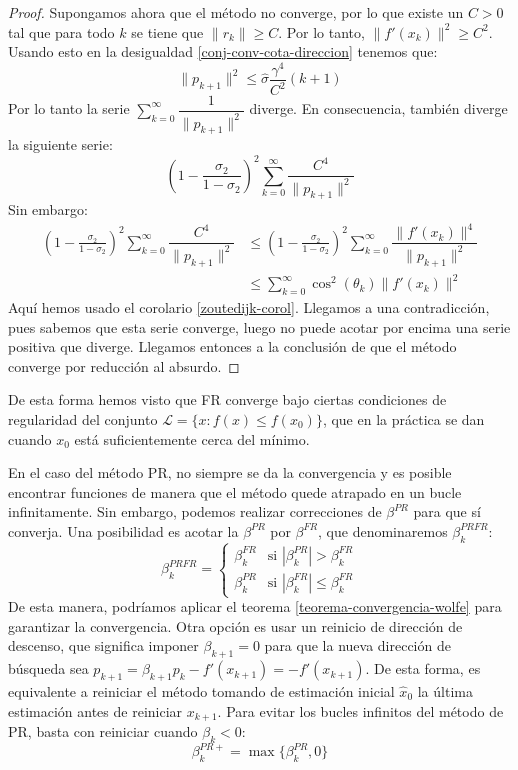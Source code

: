 \begin{theorem}
\begin{proof}
	Supongamos ahora que el método no converge, por lo que existe un $C>0$ tal que para todo $k$ se tiene que $\|r_k\|\geq C$. Por lo tanto, $\|f'(x_k)\|^2\geq C^2$. Usando esto en la desigualdad \eqref{conj-conv-cota-direccion} tenemos que:
	\begin{equation}
		\|p_{k+1}\|^2 \leq \hat{\sigma}\frac{\gamma^4}{C^2} (k+1)
	\end{equation}
	Por lo tanto la serie $\sum_{k=0}^\infty \dfrac{1}{\|p_{k+1}\|^2}$ diverge. En consecuencia, también diverge la siguiente serie:
	\[ \left(1-\frac{\sigma_2}{1-\sigma_2}\right)^2 \sum_{k=0}^\infty \dfrac{C^4}{\|p_{k+1}\|^2} \]
	Sin embargo:
	\begin{align*}
		\left(1-\frac{\sigma_2}{1-\sigma_2}\right)^2 \sum_{k=0}^\infty \dfrac{C^4}{\|p_{k+1}\|^2} & \leq \left(1-\frac{\sigma_2}{1-\sigma_2}\right)^2 \sum_{k=0}^\infty \dfrac{\|f'(x_k)\|^4}{\|p_{k+1}\|^2}\\
		& \leq \sum_{k=0}^\infty \cos^2(\theta_k) \|f'(x_k)\|^2
	\end{align*}
	Aquí hemos usado el corolario \ref{zoutedijk-corol}. Llegamos a una contradicción, pues sabemos que esta serie converge, luego no puede acotar por encima una serie positiva que diverge. Llegamos entonces a la conclusión de que el método converge por reducción al absurdo.
\end{proof}
\end{theorem}

De esta forma hemos visto que FR converge bajo ciertas condiciones de regularidad del conjunto $\mathcal{L}=\{x : f(x) \leq f(x_0)\}$, que en la práctica se dan cuando $x_0$ está suficientemente cerca del mínimo.

En el caso del método PR, no siempre se da la convergencia y es posible encontrar funciones de manera que el método quede atrapado en un bucle infinitamente. Sin embargo, podemos realizar correcciones de $\beta^{PR}$ para que sí converja. Una posibilidad es acotar la $\beta^{PR}$ por $\beta^{FR}$, que denominaremos $\beta_k^{PRFR}$:
\[ \beta_k^{PRFR} = \begin{cases}
	\beta_k^{FR} & \text{si }|\beta_k^{PR}|>\beta_k^{FR} \\
	\beta_k^{PR} & \text{si }|\beta_k^{FR}|\leq\beta_k^{FR}
\end{cases}\]
De esta manera, podríamos aplicar el teorema \ref{teorema-convergencia-wolfe} para garantizar la convergencia. Otra opción es usar un reinicio de dirección de descenso, que significa imponer $\beta_{k+1}=0$ para que la nueva dirección de búsqueda sea $p_{k+1} = \beta_{k+1} p_k - f'(x_{k+1}) = -f'(x_{k+1})$. De esta forma, es equivalente a reiniciar el método tomando de estimación inicial $\hat{x}_0$ la última estimación antes de reiniciar $x_{k+1}$. Para evitar los bucles infinitos del método de PR, basta con reiniciar cuando $\beta_k<0$:
\[ \beta_k^{PR+} = \max\{\beta_k^{PR}, 0\} \]

